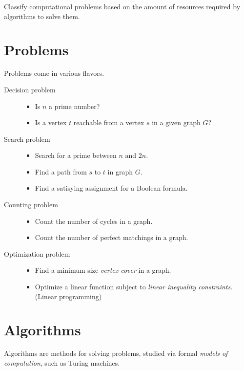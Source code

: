 \begin{center}
    Classify computational problems based on the amount of resources
    required by algorithms to solve them.
\end{center}

\section*{Problems}
Problems come in various flavors.
\begin{description}
    \item[Decision problem] \leavevmode
        \begin{itemize}
            \item Is $n$ a prime number?
            \item Is a vertex $t$ reachable from a vertex $s$ in a given
            graph $G$?
        \end{itemize}
    \item[Search problem] \leavevmode
        \begin{itemize}
            \item Search for a prime between $n$ and $2n$.
            \item Find a path from $s$ to $t$ in graph $G$.
            \item Find a satisying assignment for a Boolean formula.
        \end{itemize}
    \item[Counting problem] \leavevmode
        \begin{itemize}
            \item Count the number of cycles in a graph.
            \item Count the number of perfect matchings in a graph.
        \end{itemize}
    \item[Optimization problem] \leavevmode
        \begin{itemize}
            \item Find a minimum size \emph{vertex cover} in a graph.
            \item Optimize a linear function subject to \emph{linear
            inequality constraints}. (Linear programming)
        \end{itemize}
\end{description}

\section*{Algorithms}
Algorithms are methods for solving problems, studied via formal
\emph{models of computation}, such as Turing machines.

